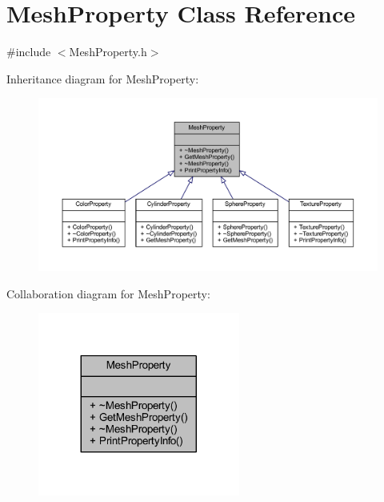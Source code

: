 \hypertarget{class_mesh_property}{}\section{Mesh\+Property Class Reference}
\label{class_mesh_property}


{\ttfamily \#include $<$Mesh\+Property.\+h$>$}



Inheritance diagram for Mesh\+Property\+:
\nopagebreak
\begin{figure}[H]
\begin{center}
\leavevmode
\includegraphics[width=350pt]{class_mesh_property__inherit__graph}
\end{center}
\end{figure}


Collaboration diagram for Mesh\+Property\+:
\nopagebreak
\begin{figure}[H]
\begin{center}
\leavevmode
\includegraphics[width=188pt]{class_mesh_property__coll__graph}
\end{center}
\end{figure}
